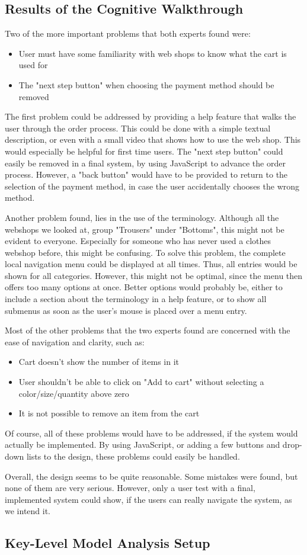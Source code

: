 \subsection{Results of the Cognitive Walkthrough}
Two of the more important problems that both experts found were:
\begin{itemize}
	\item User must have some familiarity with web shops to know what the cart is used for
	\item The "next step button" when choosing the payment method should be removed
\end{itemize}
The first problem could be addressed by providing a help feature that walks the user through the order process. This could be done with a simple textual description, or even with a small video that shows how to use the web shop. This would especially be helpful for first time users.
The "next step button" could easily be removed in a final system, by using JavaScript to advance the order process. However, a "back button" would have to be provided to return to the selection of the payment method, in case the user accidentally chooses the wrong method.

Another problem found, lies in the use of the terminology. Although all the webshops we looked at, group "Trousers" under "Bottoms", this might not be evident to everyone. Especially for someone who has never used a clothes webshop before, this might be confusing. To solve this problem, the complete local navigation menu could be displayed at all times. Thus, all entries would be shown for all categories. However, this might not be optimal, since the menu then offers too many options at once. Better options would probably be, either to include a section about the terminology in a help feature, or to show all submenus as soon as the user's mouse is placed over a menu entry.

Most of the other problems that the two experts found are concerned with the ease of navigation and clarity, such as:
\begin{itemize}
	\item Cart doesn't show the number of items in it
	\item User shouldn't be able to click on "Add to cart" without selecting a color/size/quantity above zero
	\item It is not possible to remove an item from the cart
\end{itemize}
Of course, all of these problems would have to be addressed, if the system would actually be implemented. By using JavaScript, or adding a few buttons and drop-down lists to the design, these problems could easily be handled.

Overall, the design seems to be quite reasonable. Some mistakes were found, but none of them are very serious. However, only a user test with a final, implemented system could show, if the users can really navigate the system, as we intend it.

\subsection{Key-Level Model Analysis Setup}